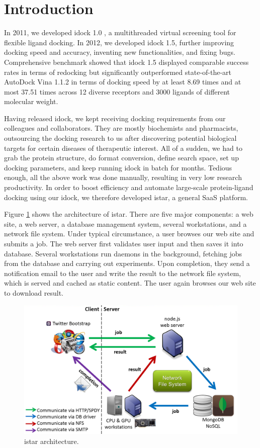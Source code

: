 \documentclass{bioinfo}
\begin{document}
\section{Introduction}

In 2011, we developed idock 1.0 \citep{1153}, a multithreaded virtual screening tool for flexible ligand docking. In 2012, we developed idock 1.5, further improving docking speed and accuracy, inventing new functionalities, and fixing bugs. Comprehensive benchmark showed that idock 1.5 displayed comparable success rates in terms of redocking but significantly outperformed state-of-the-art AutoDock Vina 1.1.2 \citep{595} in terms of docking speed by at least 8.69 times and at most 37.51 times across 12 diverse receptors and 3000 ligands of different molecular weight.

Having released idock, we kept receiving docking requirements from our colleagues and collaborators. They are mostly biochemists and pharmacists, outsourcing the docking research to us after discovering potential biological targets for certain diseases of therapeutic interest. All of a sudden, we had to grab the protein structure, do format conversion, define search space, set up docking parameters, and keep running idock in batch for months. Tedious enough, all the above work was done manually, resulting in very low research productivity. In order to boost efficiency and automate large-scale protein-ligand docking using our idock, we therefore developed istar, a general SaaS platform.

Figure \ref{istar:architecture} shows the architecture of istar. There are five major components: a web site, a web server, a database management system, several workstations, and a network file system. Under typical circumstance, a user browses our web site and submits a job. The web server first validates user input and then saves it into database. Several workstations run daemons in the background, fetching jobs from the database and carrying out experiments. Upon completion, they send a notification email to the user and write the result to the network file system, which is served and cached as static content. The user again browses our web site to download result.

\begin{figure}
\centerline{\includegraphics[width=\linewidth]{../Architecture.png}}
\caption{istar architecture.}\label{istar:architecture}
\end{figure}
\end{document}
